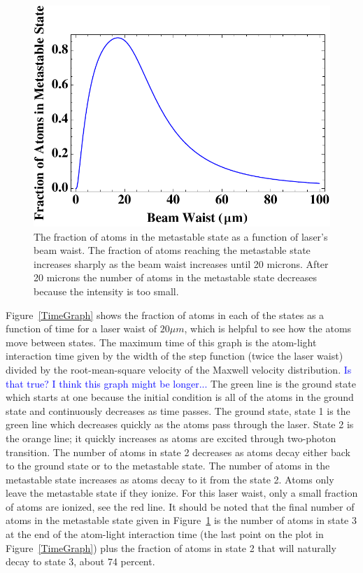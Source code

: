 \documentclass[prb,preprint]{revtex4-1}
\begin{document}
\begin{figure}[h!]
\centering
\includegraphics[width=6in]{MetaGraph1.pdf}
\caption{The fraction of atoms in the metastable state as a function of laser's beam waist. The fraction of atoms reaching the metastable state increases sharply as the beam waist increases until 20 microns. After 20 microns the number of atoms in the metastable state decreases because the intensity is too small.}
\label{MetaGraph1}
\end{figure}

Figure~\ref{TimeGraph} shows the fraction of atoms in each of the states as a function of time for a laser waist of $20 \mu m$, which is helpful to see how the atoms move between states. The maximum time of this graph is the atom-light interaction time given by the width of the step function (twice the laser waist) divided by the root-mean-square velocity of the Maxwell velocity distribution.  \textcolor{blue}{Is that true? I think this graph might be longer...} The green line is the ground state which starts at one because the initial condition is all of the atoms in the ground state and continuously decreases as time passes. The ground state, state 1 is the green line which decreases quickly as the atoms pass through the laser. State 2 is the orange line; it quickly increases as atoms are excited through two-photon transition. The number of atoms in state 2 decreases as atoms decay either back to the ground state or to the metastable state. The number of atoms in the metastable state increases as atoms decay to it from the state 2. Atoms only leave the metastable state if they ionize. For this laser waist, only a small fraction of atoms are ionized, see the red line.  It should be noted that the final number of atoms in the metastable state given in Figure~\ref{MetaGraph1} is the number of atoms in state 3 at the end of the atom-light interaction time (the last point on the plot in Figure~\ref{TimeGraph}) plus the fraction of atoms in state 2 that will naturally decay to state 3, about 74 percent.
\end{document}
